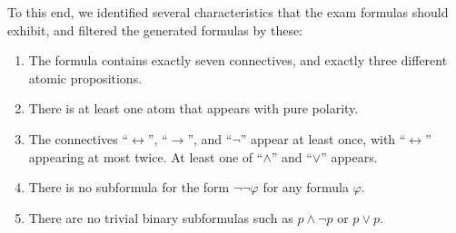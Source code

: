 To this end,
we identified several characteristics that the exam formulas should exhibit,
and filtered the generated formulas by these:
%
\begin{enumerate}
    \item
        The formula contains exactly seven connectives,
        and exactly three different atomic propositions.
    \item\label{item:polarity}
        There is at least one atom that appears with pure polarity.
    \item
        The connectives ``$\leftrightarrow$'', ``$\rightarrow$'', and ``$\lnot$'' appear at least once,
        with ``$\leftrightarrow$'' appearing at most twice.
        At least one of ``$\land$'' and ``$\lor$'' appears.
    \item
        There is no subformula for the form $\lnot \lnot \varphi$ for any formula $\varphi$.
    \item
        There are no trivial binary subformulas such as $p \land \lnot p$ or $p \lor p$.

\end{enumerate}
